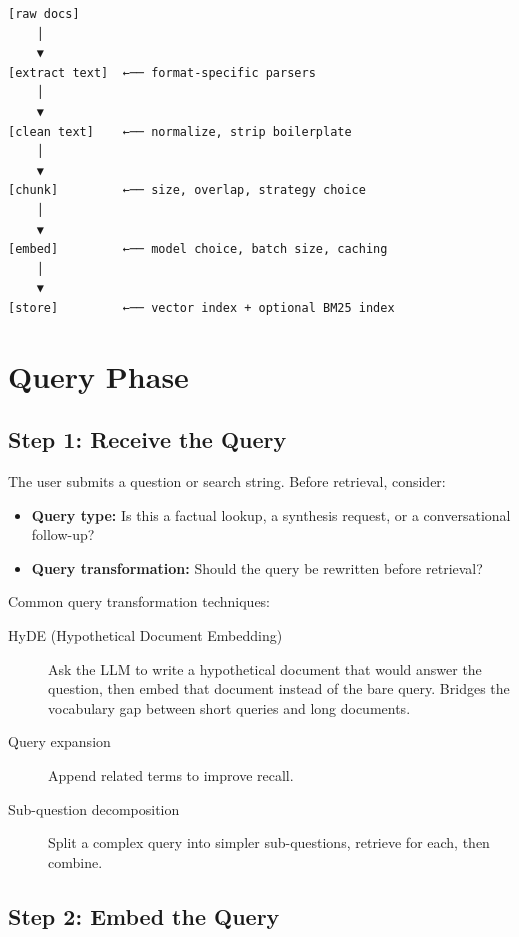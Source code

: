 \begin{Verbatim}
[raw docs]
    │
    ▼
[extract text]  ←── format-specific parsers
    │
    ▼
[clean text]    ←── normalize, strip boilerplate
    │
    ▼
[chunk]         ←── size, overlap, strategy choice
    │
    ▼
[embed]         ←── model choice, batch size, caching
    │
    ▼
[store]         ←── vector index + optional BM25 index
\end{Verbatim}

\section{Query Phase}

\subsection{Step 1: Receive the Query}

The user submits a question or search string. Before retrieval, consider:

\begin{itemize}
    \item \textbf{Query type:} Is this a factual lookup, a synthesis request, or a conversational
          follow-up?
    \item \textbf{Query transformation:} Should the query be rewritten before retrieval?
\end{itemize}

Common query transformation techniques:

\begin{description}
    \item[HyDE (Hypothetical Document Embedding)] Ask the LLM to write a hypothetical document
          that would answer the question, then embed that document instead of the bare query.
          Bridges the vocabulary gap between short queries and long documents.
    \item[Query expansion] Append related terms to improve recall.
    \item[Sub-question decomposition] Split a complex query into simpler sub-questions, retrieve
          for each, then combine.
\end{description}

\subsection{Step 2: Embed the Query}

